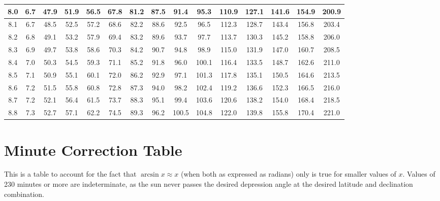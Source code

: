 \begin{footnotesize}
\begin{tabular}{c | c | c | c | c | c | c | c | c | c | c | c | c | c | c}
		8.0&6.7&47.9&51.9&56.5&67.8&81.2&87.5&91.4&95.3&110.9&127.1&141.6&154.9&200.9\\\hline
		8.1&6.7&48.5&52.5&57.2&68.6&82.2&88.6&92.5&96.5&112.3&128.7&143.4&156.8&203.4\\\hline
		8.2&6.8&49.1&53.2&57.9&69.4&83.2&89.6&93.7&97.7&113.7&130.3&145.2&158.8&206.0\\\hline
		8.3&6.9&49.7&53.8&58.6&70.3&84.2&90.7&94.8&98.9&115.0&131.9&147.0&160.7&208.5\\\hline
		8.4&7.0&50.3&54.5&59.3&71.1&85.2&91.8&96.0&100.1&116.4&133.5&148.7&162.6&211.0\\\hline
		8.5&7.1&50.9&55.1&60.1&72.0&86.2&92.9&97.1&101.3&117.8&135.1&150.5&164.6&213.5\\\hline
		8.6&7.2&51.5&55.8&60.8&72.8&87.3&94.0&98.2&102.4&119.2&136.6&152.3&166.5&216.0\\\hline
		8.7&7.2&52.1&56.4&61.5&73.7&88.3&95.1&99.4&103.6&120.6&138.2&154.0&168.4&218.5\\\hline
		8.8&7.3&52.7&57.1&62.2&74.5&89.3&96.2&100.5&104.8&122.0&139.8&155.8&170.4&221.0\\\hline
\end{tabular}\end{footnotesize}


\section{Minute Correction Table}

This is a table to account for the fact that $\arcsin x \approx x$ (when both as expressed as radians) only is true for smaller values of $x$. Values of 230 minutes or more are indeterminate, as the sun never passes the desired depression angle at the desired latitude and declination combination.

